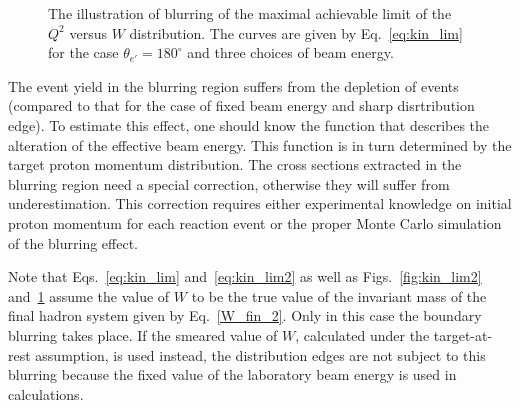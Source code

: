 \begin{figure}[!ht]
\begin{center}
\end{center}
\caption{\small  The illustration of blurring of the maximal achievable limit of the $Q^{2}$ versus $W$ distribution. The curves are given by Eq.~\eqref{eq:kin_lim} for the case $\theta_{e'}=180^{\circ}$ and three choices of beam energy. }
\label{fig:kin_lim}
\end{figure}


The event yield in the blurring region suffers from the depletion of events (compared to that for the case of fixed beam energy and sharp disrtribution edge). To estimate this effect, one should know the function that describes the alteration of the effective beam energy. This function is in turn determined by the target proton momentum distribution.
The cross sections extracted in the blurring region need a special correction, otherwise they will suffer from underestimation. This correction requires  either experimental knowledge on initial proton momentum for each reaction event or  the proper Monte Carlo simulation of the blurring effect. 


Note that Eqs.~\eqref{eq:kin_lim} and~\eqref{eq:kin_lim2} as well as Figs.~\ref{fig:kin_lim2} and~\ref{fig:kin_lim} assume the value of $W$ to be the true value of the invariant mass of the final hadron system given by Eq.~\eqref{W_fin_2}. Only in this case the boundary blurring takes place. If the smeared value of $W$, calculated under the target-at-rest assumption, is used instead, the distribution edges are not subject to this blurring because the fixed value of the laboratory beam energy is used in calculations.


 




